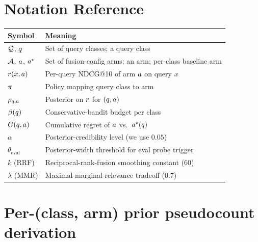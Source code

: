 \section{Notation Reference}
\label{app:notation}

\begin{center}
\begin{tabular}{ll}
\toprule
Symbol & Meaning \\
\midrule
$\mathcal{Q}$, $q$ & Set of query classes; a query class \\
$\mathcal{A}$, $a$, $a^\star$ & Set of fusion-config arms; an arm; per-class baseline arm \\
$r(x, a)$ & Per-query NDCG@10 of arm $a$ on query $x$ \\
$\pi$ & Policy mapping query class to arm \\
$\rho_{q, a}$ & Posterior on $r$ for $(q, a)$ \\
$\beta(q)$ & Conservative-bandit budget per class \\
$G(q, a)$ & Cumulative regret of $a$ vs.\ $a^\star(q)$ \\
$\alpha$ & Posterior-credibility level (we use $0.05$) \\
$\theta_\mathrm{eval}$ & Posterior-width threshold for eval probe trigger \\
$k$ (RRF) & Reciprocal-rank-fusion smoothing constant ($60$) \\
$\lambda$ (MMR) & Maximal-marginal-relevance tradeoff ($0.7$) \\
\bottomrule
\end{tabular}
\end{center}

\section{Per-(class, arm) prior pseudocount derivation}
\label{app:prior}


